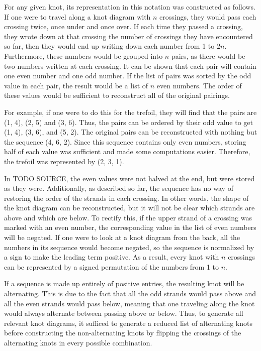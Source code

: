 \begin{paper}
For any given knot, its representation in this notation was constructed as
follows.
If one were to travel along a knot diagram with $n$ crossings, they would pass
each crossing twice, once under and once over.
If each time they passed a crossing, they wrote down at that crossing the number
of crossings they have encountered so far, then they would end up writing down
each number from 1 to $2n$.
Furthermore, these numbers would be grouped into $n$ pairs, as there would be
two numbers written at each crossing.
It can be shown that each pair will contain one even number and one odd number.
If the list of pairs was sorted by the odd value in each pair,
the result would be a list of $n$ even numbers.
The order of these values would be sufficient to reconstruct all of the original
pairings.

For example, if one were to do this for the trefoil, they will find that the
pairs are (1, 4), (2, 5) and (3, 6).
Thus, the pairs can be ordered by their odd value to get (1, 4), (3, 6), and
(5, 2).
The original pairs can be reconstructed with nothing but the sequence (4, 6, 2).
Since this sequence contains only even numbers, storing half of each value was
sufficient and made some computations easier.
Therefore, the trefoil was represented by (2, 3, 1).

In TODO SOURCE, the even values were not halved at the end, but were stored as
they were.
Additionally, as described so far, the sequence has no way of restoring the
order of the strands in each crossing.
In other words, the shape of the knot diagram can be reconstructed, but it will
not be clear which strands are above and which are below.
To rectify this, if the upper strand of a crossing was marked with an even
number, the corresponding value in the list of even numbers will be negated.
If one were to look at a knot diagram from the back, all the numbers in its
sequence would become negated, so the sequence is normalized by a sign to make
the leading term positive.
As a result, every knot with $n$ crossings can be represented by a signed
permutation of the numbers from 1 to $n$.


If a sequence is made up entirely of positive entries, the resulting knot will
be alternating.
This is due to the fact that all the odd strands would pass above and all the
even strands would pass below, meaning that one traveling along the knot would
always alternate between passing above or below.
Thus, to generate all relevant knot diagrams, it sufficed to generate a reduced
list of alternating knots before constructing the non-alternating knots by
flipping the crossings of the alternating knots in every possible combination.


\end{paper}
